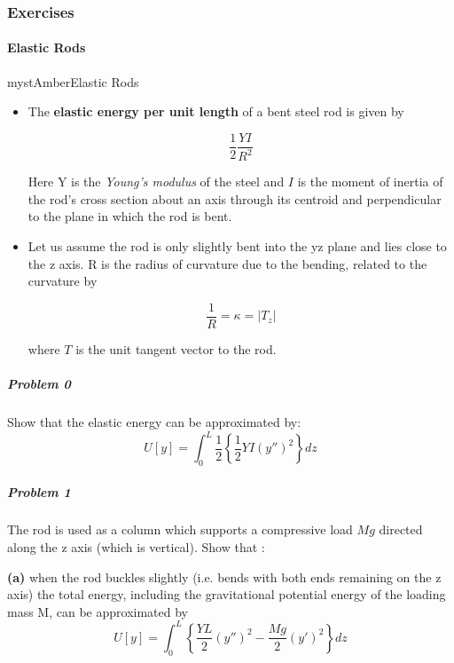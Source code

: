 \subsubsection{Exercises}

\paragraph{Elastic Rods}

\begin{mystadmonition}{mystAmber}{Elastic Rods}\begin{itemize}
\item The \textbf{elastic energy per unit length} of a bent steel rod is given by

\begin{equation}
\frac{1}{2}\frac{YI}{R^2}
\end{equation}


Here Y is the \textit{Young's modulus} of the steel and $I$ is the moment of inertia of the rod's cross section about an axis through its centroid and perpendicular to the plane in which the rod is bent.
\end{itemize}

\begin{itemize}
\item Let us assume the rod is only slightly bent into the yz plane and lies close to the z axis. R is the radius of curvature due to the bending, related to the curvature by

\begin{equation}
\frac{1}{R}=\kappa = |T_z|
\end{equation}


where $T$ is the unit tangent vector to the rod.
\end{itemize}

\subparagraph{Problem 0}

Show that the elastic energy can be approximated by:
\begin{equation}
\boxed{U[y]=\int_0^L \frac12 \left\{ \frac{1}{2} YI(y'')^2 \right\}dz}
\end{equation}

\subparagraph{Problem 1}

The rod is used as a column which supports a compressive load $Mg$ directed along the z axis (which is vertical). Show that :

\textbf{(a)} when the rod buckles slightly (i.e. bends with both ends remaining on the z axis) the
total energy, including the gravitational potential energy of the loading mass M, can be
approximated by
\begin{equation}
\boxed{U[y]=\int_0^L \left\{ \frac{YL}{2} (y'')^2 - \frac{Mg}{2}(y')^2\right\}dz}
\end{equation}


\end{mystadmonition}
